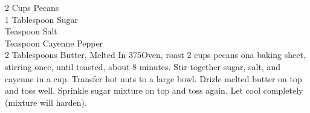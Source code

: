 {2 Cups Pecans \\
 1 Tablespoon Sugar \\
  Teaspoon Salt \\
  Teaspoon Cayenne Pepper \\
 2 Tablespoons Butter, Melted}
{In 375\degree Oven, roast 2 cups pecans ona baking sheet, stirring once, until toasted, about 8 minutes. Stir together sugar, salt, and cayenne in a cup. Transfer hot nuts to a large bowl. Drizle melted butter on top and toss well. Sprinkle sugar mixture on top and toss again. Let cool completely (mixture will harden).}
